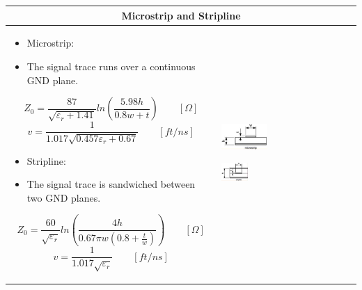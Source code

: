 		
		\begin{table}[h!]
		\centering
		\begin{tabular}{|m{}|m{}|}
				\multicolumn{2}{c}{\textbf{Microstrip and Stripline}}
			\\
			\hline
				\begin{itemize}
					\setlength{\itemsep}{-4pt}
					\item Microstrip: 
					\item[] The signal trace runs over a continuous GND plane. 
				\end{itemize}
				\begin{equation}
					Z_0 = \frac{87}{\sqrt{\varepsilon_r + 1.41}} ln\left(\frac{5.98h}{0.8w + t}\right) \qquad [\Omega]		
				\end{equation}
				\begin{equation}
					v = \frac{1}{1.017\sqrt{0.457 \varepsilon_r + 0.67}} \qquad[ft/ns]	
				\end{equation}
				\begin{itemize}
					\setlength{\itemsep}{-4pt}
					\item Stripline: 
					\item[]The signal trace is sandwiched between two GND planes. 
				\end{itemize}
			\begin{equation}
					Z_0 = \frac{60}{\sqrt{\varepsilon_r}} ln\left(\frac{4h}{0.67\pi w \left(0.8 + \frac{t}{w}\right)}\right) \qquad[\Omega]		
				\end{equation}
				\begin{equation}
					v = \frac{1}{1.017\sqrt{\varepsilon_r}} \qquad[ft/ns]	
				\end{equation}
			&
					\begin{center}\includegraphics[width=0.35\textwidth]{images/Microstrip.png}\end{center} 
					\begin{center}\includegraphics[width=0.2\textwidth]{images/Stripline.png}\end{center} 
 

\end{tabular}
\end{table}
